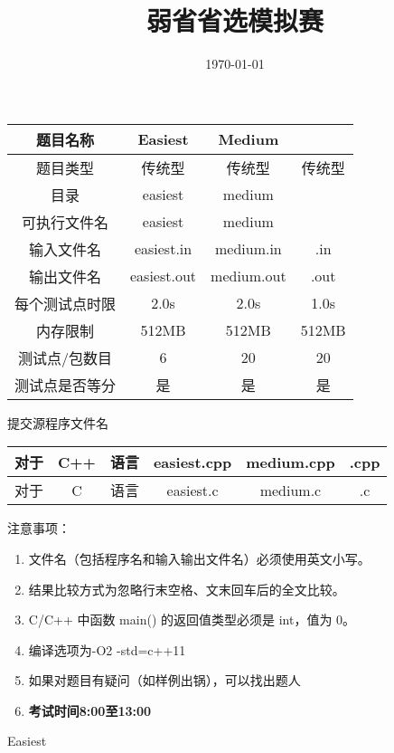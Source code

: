 \documentclass[UTF8]{ctexart}
\begin{document}
\title{弱省省选模拟赛}
\author{}
\date{\today}
\maketitle
\begin{table}[!htbp]
	\centering
	\begin{tabular}{|c|c|c|c|}
		\hline
		题目名称&Easiest&Medium&\\
		\hline
		题目类型&传统型&传统型&传统型\\
		\hline
		目录&easiest&medium&\\
		\hline
		可执行文件名&easiest&medium&\\
		\hline
		输入文件名&easiest.in&medium.in&.in\\
		\hline
		输出文件名&easiest.out&medium.out&.out\\
		\hline
		每个测试点时限&2.0s&2.0s&1.0s\\
		\hline
		内存限制&512MB&512MB&512MB\\
		\hline
		测试点/包数目&6&20&20\\
		\hline
		测试点是否等分&是&是&是\\
		\hline
	\end{tabular}
\end{table}
提交源程序文件名
\begin{table}[!htbp]
	\centering
	\begin{tabular}{|ccc|c|c|c|}
		\hline
		对于&C++&语言&easiest.cpp&medium.cpp&.cpp\\
		\hline
		对于&C&语言&easiest.c&medium.c&.c\\
		\hline
	\end{tabular}
\end{table}
注意事项：
\begin{enumerate}
	\item 文件名（包括程序名和输入输出文件名）必须使用英文小写。
	\item 结果比较方式为忽略行末空格、文末回车后的全文比较。
	\item C/C++ 中函数 main() 的返回值类型必须是 int，值为 0。
	\item 编译选项为-O2 -std=c++11
	\item 如果对题目有疑问（如样例出锅），可以找出题人
	\item \textbf{考试时间8:00至13:00}
\end{enumerate}
\clearpage



\begin{center}
	\large{Easiest}
\end{center}
\end{document}
